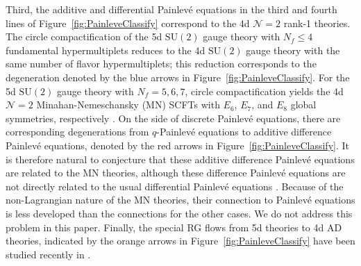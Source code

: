 \documentclass[11pt, a4paper]{article}
\theoremstyle{definition}
\begin{document}
Third, the additive and differential Painlev\'e equations in the third and fourth lines of Figure~\ref{fig:PainleveClassify} correspond to the 4d $ \mathcal{N}=2 $ rank-1 theories. The circle compactification of the 5d $ \mathrm{SU}(2) $ gauge theory with $ N_f \leq 4 $ fundamental hypermultiplets reduces to the 4d $ \mathrm{SU}(2) $ gauge theory with the same number of flavor hypermultiplets; this reduction corresponds to the degeneration denoted by the blue arrows in Figure~\ref{fig:PainleveClassify}. For the 5d $ \mathrm{SU}(2) $ gauge theory with $ N_f=5, 6, 7 $, circle compactification yields the 4d $ \mathcal{N}=2 $ Minahan-Nemeschansky (MN) SCFTs with $ E_6 $, $ E_7 $, and $ E_8 $ global symmetries, respectively \cite{Minahan:1996fg, Minahan:1996cj}. On the side of discrete Painlev\'e equations, there are corresponding degenerations from $ q $-Painlev\'e equations to additive difference Painlev\'e equations, denoted by the red arrows in Figure~\ref{fig:PainleveClassify}. It is therefore natural to conjecture that these additive difference Painlev\'e equations are related to the MN theories, although these difference Painlev\'e equations are not directly related to the usual differential Painlev\'e equations \cite{Boalch:2007}. Because of the non-Lagrangian nature of the MN theories, their connection to Painlev\'e equations is less developed than the connections for the other cases. We do not address this problem in this paper. Finally, the special RG flows from 5d theories to 4d AD theories, indicated by the orange arrows in Figure~\ref{fig:PainleveClassify} have been studied recently in \cite{Bonelli:2025juz}.
\end{document}
